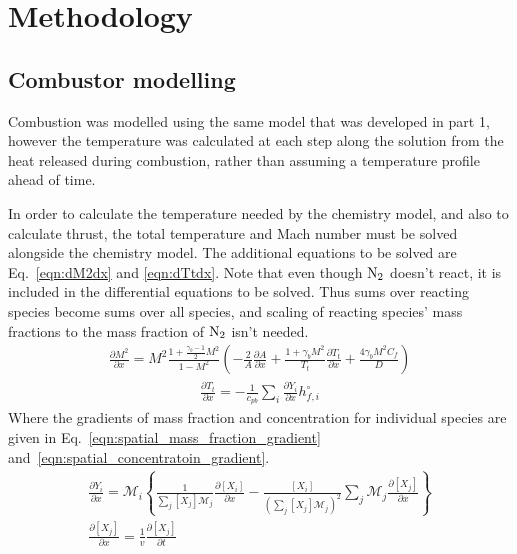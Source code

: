 \documentclass[a4paper]{article}
\begin{document}
\section{Methodology}\label{sec:methodology}

\subsection{Combustor modelling}
Combustion was modelled using the same model that was developed in part 1, however the temperature was calculated at each step along the solution from the heat released during combustion, rather than assuming a temperature profile ahead of time.

In order to calculate the temperature needed by the chemistry model, and also to calculate thrust, the total temperature and Mach number must be solved alongside the chemistry model. The additional equations to be solved are Eq.~\ref{eqn:dM2dx} and \ref{eqn:dTtdx}. Note that even though \(\ce{N2}\) doesn't react, it is included in the differential equations to be solved. Thus sums over reacting species become sums over all species, and scaling of reacting species' mass fractions to the mass fraction of \(\ce{N2}\) isn't needed.
\begin{align}\label{eqn:dM2dx}
    \frac{\partial M^2}{\partial x} =M^2 \frac{1 + \frac{\gamma_b - 1}{2}M^2}{1-M^2}\left( -\frac{2}{A} \frac{\partial A}{\partial x} + \frac{1 + \gamma_b M^2}{T_t}\frac{\partial T_t}{\partial x} + \frac{4 \gamma_b M^2 C_f}{D}\right)
\end{align}
\begin{align}\label{eqn:dTtdx}
    \frac{\partial T_t}{\partial x} = - \frac{1}{c_{pb}}\sum_i \frac{\partial Y_i}{\partial x}h_{f,i}^\circ
\end{align}
Where the gradients of mass fraction and concentration for individual species are given in Eq.~\ref{eqn:spatial_mass_fraction_gradient} and~\ref{eqn:spatial_concentratoin_gradient}.
\begin{gather}
    \label{eqn:spatial_mass_fraction_gradient}
    \frac{\partial Y_i}{\partial x} = \mathcal{M}_i \left\lbrace \frac{1}{\sum_j \left[X_j\right]\mathcal{M}_j} \frac{\partial \left[X_i\right]}{\partial x} - \frac{\left[ X_i \right]}{\left(\sum_j \left[X_j\right]\mathcal{M}_j \right)^2 }\sum_j \mathcal{M}_j\frac{\partial \left[ X_j \right]}{\partial x} \right\rbrace \\
    \label{eqn:spatial_concentratoin_gradient}
    \frac{\partial \left[X_j\right]}{\partial x} = \frac{1}{v}\frac{\partial \left[X_j\right]}{\partial t}
\end{gather}
\end{document}
